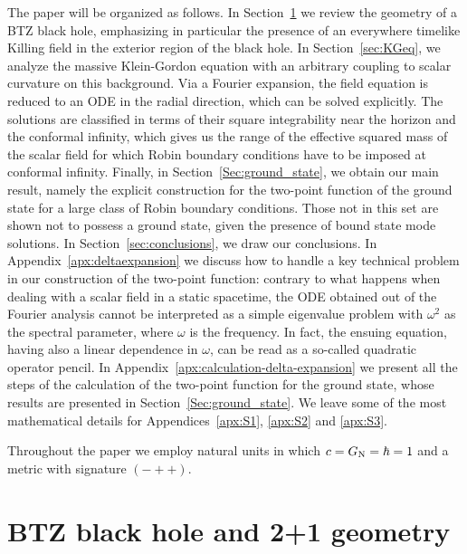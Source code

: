 \documentclass[aps, prd, amsmath, floats, floatfix, twocolumn, nofootinbib, superscriptaddress, showpacs]{revtex4-1}
\begin{document}
The paper will be organized as follows. In
Section~\ref{sec:BTZ_geometry} we review the geometry of a BTZ black
hole, emphasizing in particular the presence of an everywhere timelike
Killing field in the exterior region of the black hole. In
Section~\ref{sec:KGeq}, we analyze the massive Klein-Gordon equation 
with an arbitrary coupling to scalar curvature on this background.
Via a Fourier expansion, the field equation is reduced to an ODE in the radial direction, 
which can be solved explicitly. The solutions are classified in terms of their square 
integrability near the horizon and the conformal infinity, which gives us the range of 
the effective squared mass of the scalar field for which Robin boundary conditions 
have to be imposed at conformal infinity. Finally, in
Section~\ref{Sec:ground_state}, we obtain our main result, namely the
explicit construction for the two-point function of the ground state for
a large class of Robin boundary conditions. Those not in this set are
shown not to possess a ground state, given the presence of bound state
mode solutions. In Section~\ref{sec:conclusions}, we draw our
conclusions. In Appendix~\ref{apx:deltaexpansion} we
discuss how to handle a key technical problem in our construction of the 
two-point function: contrary to what happens when dealing with a scalar field
in a static spacetime, the ODE obtained out of the Fourier analysis
cannot be interpreted as a simple eigenvalue problem with $\omega^2$ as
the spectral parameter, where $\omega$ is the frequency. In fact, the ensuing equation, having also a 
linear dependence in $\omega$, can be read as a so-called quadratic operator pencil. 
In Appendix~\ref{apx:calculation-delta-expansion} we present all the steps of the calculation 
of the two-point function for the ground state, whose results are presented in Section~\ref{Sec:ground_state}. 
We leave some of the most mathematical details for Appendices~\ref{apx:S1}, \ref{apx:S2} 
and \ref{apx:S3}.

Throughout the paper we employ natural units in which $c = G_{\rm N} =
\hbar = 1$ and a metric with signature $({-}{+}{+})$.





\section{BTZ black hole and 2+1 geometry}
\label{sec:BTZ_geometry}


\end{document}
